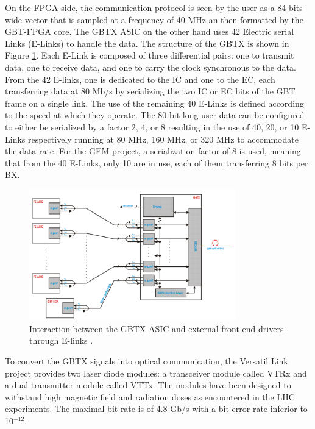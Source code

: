       On the FPGA side, the communication protocol is seen by the user as a 84-bits-wide vector that is sampled at a frequency of 40 MHz an then formatted by the GBT-FPGA core. The GBTX ASIC on the other hand uses 42 Electric serial Links (E-Links) to handle the data. The structure of the GBTX is shown in Figure \ref{fig:II-2-gbt-asic}. Each E-Link is composed of three differential pairs: one to transmit data, one to receive data, and one to carry the clock synchronous to the data. From the 42 E-links, one is dedicated to the IC and one to the EC, each transferring data at 80 Mb/s by serializing the two IC or EC bits of the GBT frame on a single link. The use of the remaining 40 E-Links is defined according to the speed at which they operate. The 80-bit-long user data can be configured to either be serialized by a factor 2, 4, or 8 resulting in the use of 40, 20, or 10 E-Links respectively running at 80 MHz, 160 MHz, or 320 MHz to accommodate the data rate. For the GEM project, a serialization factor of 8 is used, meaning that from the 40 E-Links, only 10 are in use, each of them transferring 8 bits per BX. \\

      \begin{figure}[h!]
        \centering
        \includegraphics[width=0.8\textwidth]{img/II-2-daq/gbt-asic.png}
        \caption{Interaction between the GBTX ASIC and external front-end drivers through E-links \cite{Moreira:1235836}.}
        \label{fig:II-2-gbt-asic}
      \end{figure}

      To convert the GBTX signals into optical communication, the Versatil Link project provides two laser diode modules: a transceiver module called VTRx and a dual transmitter module called VTTx. The modules have been designed to withstand high magnetic field and radiation doses as encountered in the LHC experiments. The maximal bit rate is of 4.8 Gb/s with a bit error rate inferior to 10$^{-12}$.

